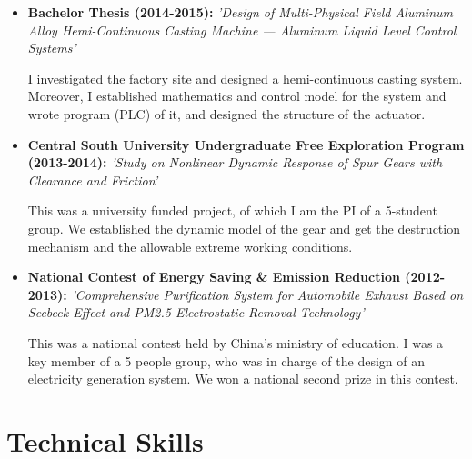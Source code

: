 \documentclass[11pt,a4paper,sans]{moderncv}         %
\begin{document}
\begin{itemize}
	      \vspace{6pt}

	\item{\textbf{Bachelor Thesis (2014-2015): }\textit{'Design of Multi-Physical Field Aluminum Alloy Hemi-Continuous Casting Machine — Aluminum Liquid Level Control Systems'}

	      \vspace{3pt}

	      \small{I investigated the factory site and designed a hemi-continuous casting system. Moreover, I established mathematics and control model for the system and wrote program (PLC) of it, and designed the structure of the actuator.}}

	      \vspace{6pt}

	\item{\textbf{Central South University Undergraduate Free Exploration Program (2013-2014): }\textit{'Study on Nonlinear Dynamic Response of Spur Gears with Clearance and Friction'}

	      \vspace{3pt}

	      \small{This was a university funded project, of which I am the PI of a 5-student group. We established the dynamic model of the gear and get the destruction mechanism and the allowable extreme working conditions.}}

	      \vspace{6pt}

	\item{\textbf{National Contest of Energy Saving \& Emission Reduction (2012-2013): }\textit{'Comprehensive Purification System for Automobile Exhaust Based on Seebeck Effect and PM2.5 Electrostatic Removal Technology'}

	      \vspace{3pt}

	      \small{This was a national contest held by China's ministry of education. I was a key member of a 5 people group, who was in charge of the design of an electricity generation system. We won a national second prize in this contest.}}

\end{itemize}

\section{Technical Skills}

\vspace{3pt}
\end{document}
